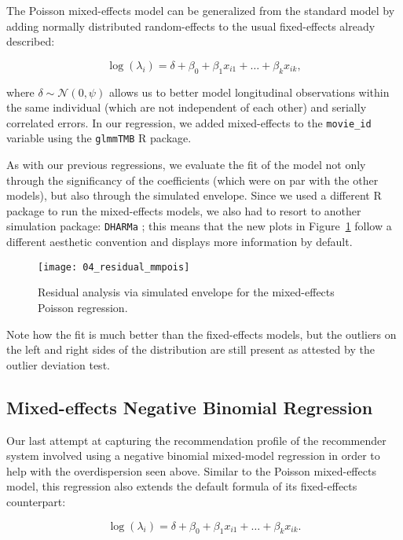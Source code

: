 The Poisson mixed-effects model can be generalized \citep{noauthor_applied_2023}
from the standard model by adding normally distributed random-effects to the
usual fixed-effects already described:

$$
\log(\lambda_i) = \delta + \beta_0 + \beta_1 x_{i1} + \dots + \beta_k x_{ik},
$$

\noindent where $\delta \sim \mathcal{N}(0,\psi)$ allows us to better model
longitudinal observations within the same individual (which are not independent
of each other) and serially correlated errors. In our regression, we added
mixed-effects to the \verb|movie_id| variable using the \verb|glmmTMB|
\citep{brooks_glmmtmb_2017} R package.

As with our previous regressions, we evaluate the fit of the model not only
through the significancy of the coefficients (which were on par with the other
models), but also through the simulated envelope. Since we used a different R
package to run the mixed-effects models, we also had to resort to another
simulation package: \verb|DHARMa| \citep{florian_dharma_2022}; this means that
the new plots in Figure~\ref{fig:fig04_residual_mmpois} follow a different
aesthetic convention and displays more information by default.

\begin{figure}
  \centering
  \texttt{[image: 04\_residual\_mmpois]}
  \caption{Residual analysis via simulated envelope for the mixed-effects Poisson regression.\label{fig:fig04_residual_mmpois}}
\end{figure}

Note how the fit is much better than the fixed-effects models, but the outliers
on the left and right sides of the distribution are still present as attested by
the outlier deviation test.

\subsection{Mixed-effects Negative Binomial Regression}
\label{subsec:mmnegbin04}

Our last attempt at capturing the recommendation profile of the recommender
system involved using a negative binomial mixed-model regression in order to
help with the overdispersion seen above. Similar to the Poisson mixed-effects
model, this regression also extends the default formula of its fixed-effects
counterpart:

$$
\log(\lambda_i) = \delta + \beta_0 + \beta_1 x_{i1} + \dots + \beta_k x_{ik}.
$$

